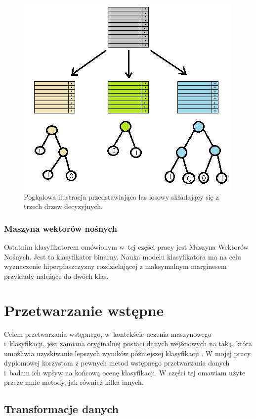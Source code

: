 \documentclass[../thesis.tex]{subfiles}
\begin{document}
\begin{figure}[h]
\centering
\includegraphics[height=.3\textheight]{random_forest.png}
\caption{Poglądowa ilustracja przedstawiająca las losowy składający się z trzech drzew decyzyjnych.}
\label{classification:random_forest}
\end{figure}

\subsubsection{Maszyna wektorów nośnych}

Ostatnim klasyfikatorem omówionym w~tej części pracy jest Maszyna Wektorów Nośnych. Jest to klasyfikator binarny. Nauka modelu klasyfikatora ma na celu wyznaczenie hiperpłaszczyzny rozdzielającej z maksymalnym marginesem przykłady należące do dwóch klas.

\section{Przetwarzanie wstępne}

Celem przetwarzania wstępnego, w~kontekście uczenia maszynowego i~klasyfikacji, jest zamiana oryginalnej postaci danych wejściowych na taką, która umożliwia uzyskiwanie lepszych wyników późniejszej klasyfikacji \cite{def_preprocessing}. W mojej pracy dyplomowej korzystam z pewnych metod wstępnego przetwarzania danych i~badam ich wpływ na końcową ocenę klasyfikacji. W części tej omawiam użyte przeze mnie metody, jak również kilka innych.

\subsection{Transformacje danych}
\end{document}
